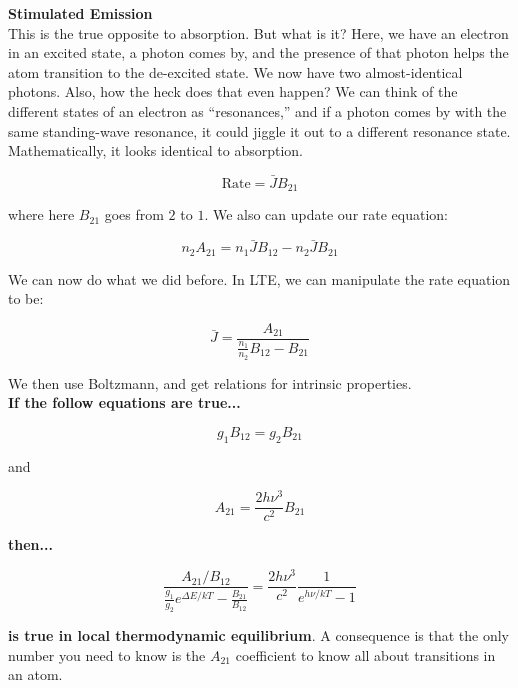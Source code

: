 \documentclass{article}
\begin{document}
\noindent\textbf{Stimulated Emission}\\

This is the true opposite to absorption. But what is it? Here, we have an electron in an excited state, a photon comes by, and the presence of that photon helps the atom transition to the de-excited state. We now have two almost-identical photons. Also, how the heck does that even happen? We can think of the different states of an electron as ``resonances,'' and if a photon comes by with the same standing-wave resonance, it could jiggle it out to a different resonance state. Mathematically, it looks identical to absorption.

\begin{equation}
    \text{Rate} = \bar{J} B_{21} 
\end{equation}

where here $B_{21}$ goes from $2$ to $1$. We also can update our rate equation:

\begin{equation}
    \boxed{n_2 A_{21} = n_1 \bar{J} B_{12} - n_2 \bar{J} B_{21}}
\end{equation}

We can now do what we did before. In LTE, we can manipulate the rate equation to be:

\begin{equation}
    \bar{J} = \frac{A_{21}}{\frac{n_1}{n_2} B_{12} - B_{21}}
\end{equation}

We then use Boltzmann, and get relations for intrinsic properties. \\

\textbf{If the follow equations are true...}

\begin{equation}
    g_1 B_{12} = g_2 B_{21}
\end{equation}

and

\begin{equation}
    A_{21} = \frac{2 h \nu^3}{c^2} B_{21}
\end{equation}

\textbf{then...}

\begin{equation}
    \frac{A_{21}/B_{12}}{\frac{g_1}{g_2} e^{\Delta E/kT} - \frac{B_{21}}{B_{12}}} = \frac{2 h \nu^3}{c^2} \frac{1}{e^{h\nu/kT} - 1}
\end{equation}

\textbf{is true in local thermodynamic equilibrium}. A consequence is that the only number you need to know is the $A_{21}$ coefficient to know all about transitions in an atom. \\
\end{document}
